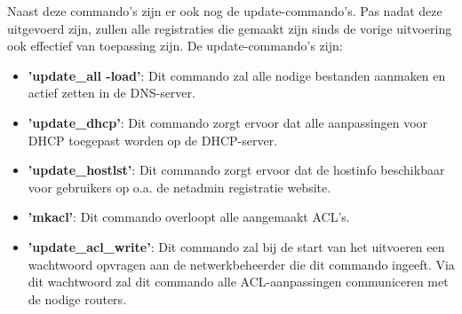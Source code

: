 Naast deze commando's zijn er ook nog de update-commando's. Pas nadat deze uitgevoerd zijn, zullen alle registraties die gemaakt zijn sinds de vorige uitvoering ook effectief van toepassing zijn. De update-commando's zijn:

\begin{itemize}
    \item \textbf{'update\_all -load'}: Dit commando zal alle nodige bestanden aanmaken en actief zetten in de DNS-server.
    \item \textbf{'update\_dhcp'}: Dit commando zorgt ervoor dat alle aanpassingen voor DHCP toegepast worden op de DHCP-server.
    \item \textbf{'update\_hostlst'}: Dit commando zorgt ervoor dat de hostinfo beschikbaar voor gebruikers op o.a. de netadmin registratie website.
    \item \textbf{'mkacl'}: Dit commando overloopt alle aangemaakt ACL's.
    \item \textbf{'update\_acl\_write'}: Dit commando zal bij de start van het uitvoeren een wachtwoord opvragen aan de netwerkbeheerder die dit commando ingeeft. Via dit wachtwoord zal dit commando alle ACL-aanpassingen communiceren met de nodige routers.
\end{itemize}



